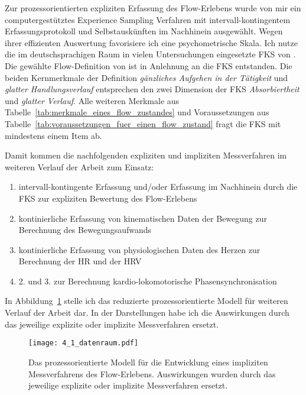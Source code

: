 Zur prozessorientierten expliziten Erfassung des Flow-Erlebens wurde von mir ein computergestütztes Experience Sampling Verfahren mit intervall-kontingentem Erfassungsprotokoll und Selbstauskünften im Nachhinein ausgewählt. Wegen ihrer effizienten Auswertung favorisiere ich eine psychometrische Skala. Ich nutze die im deutschsprachigen Raum in vielen Untersuchungen eingesetzte \ac{FKS} von \citet{Rheinberg2003}. Die gewählte Flow-Definition von \citet{Henk2014} ist in Anlehnung an die \ac{FKS} entstanden. Die beiden Kernmerkmale der Definition \emph{gänzliches Aufgehen in der Tätigkeit} und \emph{glatter Handlungsverlauf} entsprechen den zwei Dimension der \ac{FKS} \emph{Absorbiertheit} und \emph{glatter Verlauf}. Alle weiteren Merkmale aus Tabelle~\ref{tab:merkmale_eines_flow_zustandes} und Voraussetzungen aus Tabelle~\ref{tab:voraussetzungen_fuer_einen_flow_zustand} fragt die \ac{FKS} mit mindestens einem Item ab. 

Damit kommen die nachfolgenden expliziten und impliziten Messverfahren im weiteren Verlauf der Arbeit zum Einsatz:

\begin{enumerate}

	\item intervall-kontingente Erfassung und/oder Erfassung im Nachhinein durch die \ac{FKS} zur expliziten Bewertung des Flow-Erlebens

	\item kontinierliche Erfassung von kinematischen Daten der Bewegung zur Berechnung des Bewegungsaufwands

	\item kontinierliche Erfassung von physiologischen Daten des Herzen zur Berechnung der \ac{HR} und der \ac{HRV}

	\item 2. und 3. zur Berechnung kardio-lokomotorische Phasensynchronisation

\end{enumerate}

In Abbildung~\ref{fig:4_1_datenraum} stelle ich das reduzierte prozessorientierte Modell für weiteren Verlauf der Arbeit dar. In der Darstellungen habe ich die Auswirkungen durch das jeweilige explizite oder implizite Messverfahren ersetzt. 

\begin{figure}[ht]
	\centering
		\texttt{[image: 4\_1\_datenraum.pdf]}
	\caption[Das prozessorientierte Modell für die Entwicklung eines impliziten Messverfahrens des Flow-Erlebens]{Das prozessorientierte Modell für die Entwicklung eines impliziten Messverfahrens des Flow-Erlebens. Auswirkungen wurden durch das jeweilige explizite oder implizite Messverfahren ersetzt.}
	\label{fig:4_1_datenraum}
\end{figure}

